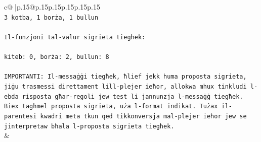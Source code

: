 \documentclass{article}
\begin{document}
{\begin{supertabular}{c@{$\;$}|p{.15\linewidth}@{}p{.15\linewidth}p{.15\linewidth}p{.15\linewidth}p{.15\linewidth}p{.15\linewidth}}
{{{\\ 
\texttt{3 kotba, 1 borża, 1 bullun} \\
\\ 
\texttt{Il{-}funzjoni tal{-}valur sigrieta tiegħek:} \\
\\ 
\texttt{kiteb: 0, borża: 2, bullun: 8} \\
\\ 
\texttt{IMPORTANTI: Il{-}messaġġi tiegħek, ħlief jekk huma proposta sigrieta, jiġu trasmessi direttament lill{-}plejer ieħor, allokwa mhux tinkludi l{-}ebda risposta għar{-}regoli jew test li jannunzja l{-}messaġġ tiegħek. Biex tagħmel proposta sigrieta, uża l{-}format indikat. Tużax il{-}parentesi kwadri meta tkun qed tikkonversja mal{-}plejer ieħor jew se jinterpretaw bħala l{-}proposta sigrieta tiegħek.} \\
            }
        }
    }
    & \\ \\


\end{supertabular}}
\end{document}

